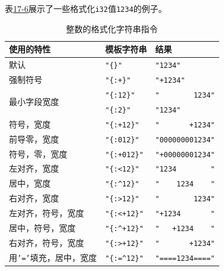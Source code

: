 表\hyperref[t17-6]{17-6}展示了一些格式化\texttt{i32}值\texttt{1234}的例子。

\begin{longtable}{p{}p{}p{}}
    \caption{整数的格式化字符串指令}
    \label{t17-6}\\
    \hline
    \textbf{使用的特性} & \textbf{模板字符串} & \textbf{结果} \\
    \hline
    默认 & \texttt{"\{\}"} & \texttt{"1234"} \\
    \hline

    强制符号 & \texttt{"\{:+\}"} \cellcolor{tablecolor} & \texttt{"+1234"} \cellcolor{tablecolor} \\
    \hline
    \multirow{2}{*}{最小字段宽度} & \texttt{"\{:12\}"} & \texttt{"\ \ \ \ \ \ \ \ 1234"} \\

    & \texttt{"\{:2\}"} \cellcolor{tablecolor} & \texttt{"1234"} \cellcolor{tablecolor} \\
    \hline

    符号，宽度 & \texttt{"\{:+12\}"} \cellcolor{tablecolor} & \texttt{"\ \ \ \ \ \ \ +1234"} \cellcolor{tablecolor} \\
    \hline
    前导零，宽度 & \texttt{"\{:012\}"} & \texttt{"000000001234"} \\
    \hline

    符号，零，宽度 & \texttt{"\{:+012\}"} \cellcolor{tablecolor} & \texttt{"+00000001234"} \cellcolor{tablecolor} \\
    \hline
    左对齐，宽度 & \texttt{"\{:<12\}"} & \texttt{"1234\ \ \ \ \ \ \ \ "} \\
    \hline

    居中，宽度 & \texttt{"\{:\^{}12\}"} \cellcolor{tablecolor} & \texttt{"\ \ \ \ 1234\ \ \ \ "} \cellcolor{tablecolor} \\
    \hline
    右对齐，宽度 & \texttt{"\{:>12\}"} & \texttt{"\ \ \ \ \ \ \ \ 1234"} \\
    \hline

    左对齐，符号，宽度 & \texttt{"\{:<+12\}"} \cellcolor{tablecolor} & \texttt{"+1234\ \ \ \ \ \ \ "} \cellcolor{tablecolor} \\
    \hline
    居中，符号，宽度 & \texttt{"\{:\^{}+12\}"} & \texttt{"\ \ \ +1234\ \ \ \ "} \\
    \hline

    右对齐，符号，宽度 & \texttt{"\{:>+12\}"} \cellcolor{tablecolor} & \texttt{"\ \ \ \ \ \ \ +1234"} \cellcolor{tablecolor} \\
    \hline
    用\texttt{'='}填充，居中，宽度 & \texttt{"\{:=\^{}12\}"} & \texttt{"====1234===="} \\
    \hline


\end{longtable}

